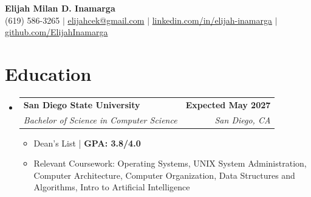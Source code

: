 \documentclass[10pt,letterpaper]{article}
\makeatletter
\newcommand{\resumeItem}[1]{\item\small{#1}}
\newcommand{\resumeHeading}[4]{
  \vspace{2pt}\item
    \begin{tabular*}{0.97\textwidth}[t]{l@{\extracolsep{\fill}}r}
      \textbf{#1} & \textbf{\small #2} \\
      \textit{\small#3} & \textit{\small #4} \\
    \end{tabular*}\vspace{-5pt}
}
\makeatother
\begin{document}
\pagestyle{empty}

\begin{center}
    {\huge \textbf{Elijah Milan D. Inamarga}} \\ \vspace{9pt}
    \small (619) 586-3265 $|$ 
    \href{mailto:elijahcek@gmail.com}{elijahcek@gmail.com} $|$ 
    \href{https://www.linkedin.com/in/elijah-inamarga/}{linkedin.com/in/elijah-inamarga} $|$ 
    \href{https://github.com/ElijahInamarga}{github.com/ElijahInamarga}
\end{center}

\section{Education}
\begin{itemize}[leftmargin=0.15in, label={}]
    \resumeHeading
      {San Diego State University}{\textbf{Expected May 2027}}
      {Bachelor of Science in Computer Science}{San Diego, CA}
      \begin{itemize}[leftmargin=0.2in, label=$\bullet$, nosep]
        \resumeItem{Dean's List | \textbf{GPA: 3.8/4.0}}
        \resumeItem{Relevant Coursework: Operating Systems, UNIX System Administration, Computer Architecture, Computer Organization, Data Structures and Algorithms, Intro to Artificial Intelligence}
      \end{itemize}
\end{itemize}

\end{document}
